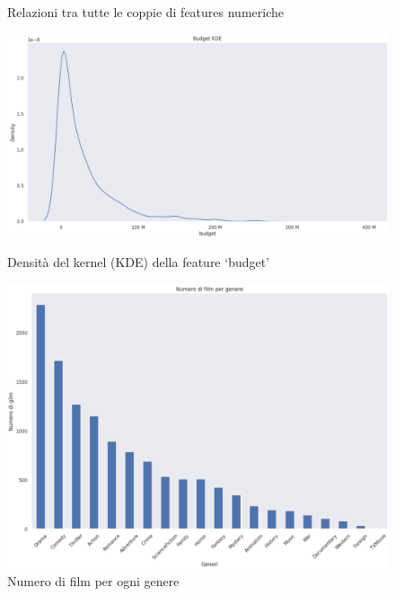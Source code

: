 \documentclass{report}
\begin{document}
\begin{figure}[H]
\begin{minipage}{.45\textwidth}
            \caption{Relazioni tra tutte le coppie di features numeriche}
            \label{fig:enter-label}
            \end{minipage}
            \begin{minipage}{.45\textwidth}
                \centering
                \includegraphics[width=1\linewidth]{EDA/eda4.png}
                \caption{Densità del kernel (KDE) della feature ‘budget’}
                \label{fig:enter-label}
            \end{minipage}
            \begin{minipage}{.45\textwidth}
                \centering
                \includegraphics[width=1\linewidth]{EDA/eda2.png}
                \caption{Numero di film per ogni genere}
                \label{fig:enter-label}
            \end{minipage}
        \end{figure}
\end{document}
